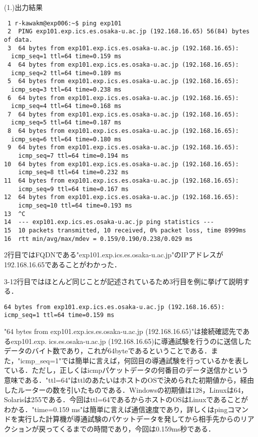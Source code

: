 \documentclass[a4j]{jarticle}
\newenvironment{bit}{\begin{breakitembox}}{\end{breakitembox}} %
\begin{document}
\begin{bit}[l]{(1.)出力結果}
\small{
\begin{verbatim}
 1 r-kawakm@exp006:~$ ping exp101
 2	PING exp101.exp.ics.es.osaka-u.ac.jp (192.168.16.65) 56(84) bytes of data.
 3	64 bytes from exp101.exp.ics.es.osaka-u.ac.jp (192.168.16.65):
  icmp_seq=1 ttl=64 time=0.159 ms
 4	64 bytes from exp101.exp.ics.es.osaka-u.ac.jp (192.168.16.65):
  icmp_seq=2 ttl=64 time=0.189 ms
 5	64 bytes from exp101.exp.ics.es.osaka-u.ac.jp (192.168.16.65):
  icmp_seq=3 ttl=64 time=0.238 ms
 6	64 bytes from exp101.exp.ics.es.osaka-u.ac.jp (192.168.16.65):
  icmp_seq=4 ttl=64 time=0.168 ms
 7	64 bytes from exp101.exp.ics.es.osaka-u.ac.jp (192.168.16.65):
  icmp_seq=5 ttl=64 time=0.187 ms
 8	64 bytes from exp101.exp.ics.es.osaka-u.ac.jp (192.168.16.65):
  icmp_seq=6 ttl=64 time=0.180 ms
 9	64 bytes from exp101.exp.ics.es.osaka-u.ac.jp (192.168.16.65):
    icmp_seq=7 ttl=64 time=0.194 ms
10	64 bytes from exp101.exp.ics.es.osaka-u.ac.jp (192.168.16.65):
    icmp_seq=8 ttl=64 time=0.232 ms
11	64 bytes from exp101.exp.ics.es.osaka-u.ac.jp (192.168.16.65):
    icmp_seq=9 ttl=64 time=0.167 ms
12	64 bytes from exp101.exp.ics.es.osaka-u.ac.jp (192.168.16.65):
    icmp_seq=10 ttl=64 time=0.193 ms
13	^C
14	--- exp101.exp.ics.es.osaka-u.ac.jp ping statistics ---
15	10 packets transmitted, 10 received, 0% packet loss, time 8999ms
16	rtt min/avg/max/mdev = 0.159/0.190/0.238/0.029 ms
\end{verbatim}
}
\end{bit}

2行目ではFQDNである"exp101.exp.ics.es.osaka-u.ac.jp"のIPアドレスが192.168.16.65であることがわかった．

3-12行目ではほとんど同じことが記述されているため3行目を例に挙げて説明する．

\begin{verbatim}
64 bytes from exp101.exp.ics.es.osaka-u.ac.jp (192.168.16.65):
icmp_seq=1 ttl=64 time=0.159 ms
\end{verbatim}

"64 bytes from exp101.exp.ics.es.osaka-u.ac.jp (192.168.16.65)"は接続確認先であるexp101.exp.
ics.es.osaka-u.ac.jp (192.168.16.65)に導通試験を行うのに送信したデータのバイト数であり，これが64byteであるということである．また，"icmp\_seq=1"では簡単に言えば，何回目の導通試験を行っているかを表している．ただし，正しくはicmpパケットデータの何番目のデータ送信かという意味である．"ttl=64"はttlのあたいはホストのOSで決められた初期値から，経由したルーターの数を引いたものである．Windowsの初期値は128，Linuxは64，Solarisは255である．今回はttl=64であるからホストのOSはLinuxであることがわかる．"time=0.159 ms"は簡単に言えば通信速度であり，詳しくはpingコマンドを実行した計算機が導通試験のパケットデータを発してから相手先からのリアクションが戻ってくるまでの時間であり，今回は0.159ms秒である．
\end{document}
